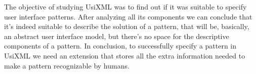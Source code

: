The objective of studying UsiXML was to find out if it was suitable to specify user interface patterns. After analyzing all its components we can conclude that it's indeed suitable to describe the solution of a pattern, that will be, basically, an abstract user interface model, but there's no space for the descriptive components of a pattern. In conclusion, to successfully specify a pattern in UsiXML we need an extension that stores all the extra information needed to make a pattern recognizable by humans.
